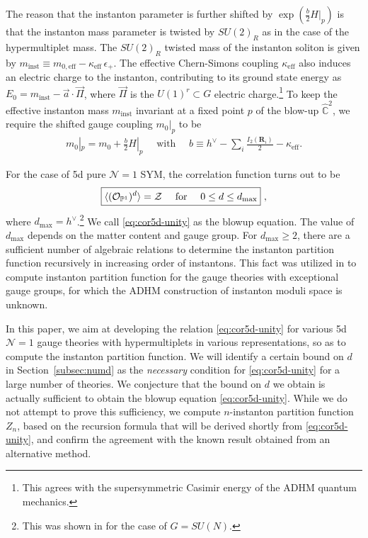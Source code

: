 \documentclass[letterpaper, 11pt]{article}
\def\IC{\mathbb{C}}
\def\IP{\mathbb{P}}
\def\CZ{{\cal Z}}
\def\e{\epsilon}
\def\k{\kappa}
\begin{document}
The reason that the instanton parameter is further shifted by $\exp(\frac{b}{2} H|_p) $ is that the instanton mass parameter is twisted by $SU(2)_R$ as in the case of the hypermultiplet mass. The $SU(2)_R$ twisted mass of the instanton soliton is given by $m_\text{inst} \equiv m_{0, \textrm{eff}} - \kappa_\text{eff}\,\e_+$. The effective Chern-Simons coupling $\k_{\textrm{eff}}$ also induces an electric charge to the instanton, contributing to its ground state energy as $E_0 = m_\text{inst} - \vec{a} \cdot \vec{\Pi}$, where $\vec{\Pi}$ is the $U(1)^r \subset G$ electric charge.\footnote{This agrees with the supersymmetric Casimir energy of the ADHM quantum mechanics.} To keep the effective instanton mass $m_\text{inst}$ invariant at a fixed point $p$ of the blow-up $\hat{\IC}^2$, we require the shifted gauge coupling $m_0|_p$  to be 
\begin{align}
  \label{eq:coupling-shift}
  m_0|_p = m_0 + \frac{b}{2}H|_p \quad \text{ with }\quad
  b \equiv h^{\vee}-\sum_i\frac{I_2(\boldsymbol{R}_i)}{2} - \kappa_\text{eff}.
\end{align}

For the case of 5d pure $\mathcal{N}=1$ SYM, the correlation function turns out to be  
\begin{align}
  \label{eq:cor5d-unity}
\boxed{  \langle (\mathcal{O}_{\IP^1})^{d}\rangle = \CZ \quad \text{ for }\quad 0\leq d \leq d_\text{max} } \ , 
\end{align}
where $d_\text{max} = h^\vee$.\footnote{This was shown in \cite{Nakajima:2005fg} for the case of $G=SU(N)$.} We call \eqref{eq:cor5d-unity} as the blowup equation. The value of $d_{\text{max}}$ depends on the matter content and gauge group. For $d_\text{max} \geq 2$, there are a sufficient number of algebraic relations to determine the instanton partition function recursively in increasing order of instantons. This fact was utilized in \cite{Keller:2012da} to compute instanton partition function for the gauge theories with exceptional gauge groups, for which the ADHM construction of instanton moduli space is unknown. 

In this paper, we aim at developing the relation \eqref{eq:cor5d-unity} for various 5d 
$\mathcal{N}=1$ gauge theories with hypermultiplets in various representations, so as to compute the instanton partition function. We will identify a certain bound on $d$ in Section~\ref{subsec:numd} as the \emph{necessary} condition for \eqref{eq:cor5d-unity} for a large number of theories. 
We conjecture that the bound on $d$ we obtain is actually sufficient to obtain the blowup equation \eqref{eq:cor5d-unity}. While we do not attempt to prove this sufficiency, we compute $n$-instanton partition function $Z_n$, based on the recursion formula that will be derived shortly from \eqref{eq:cor5d-unity}, and confirm the agreement with the known result obtained from an alternative method.
\end{document}
